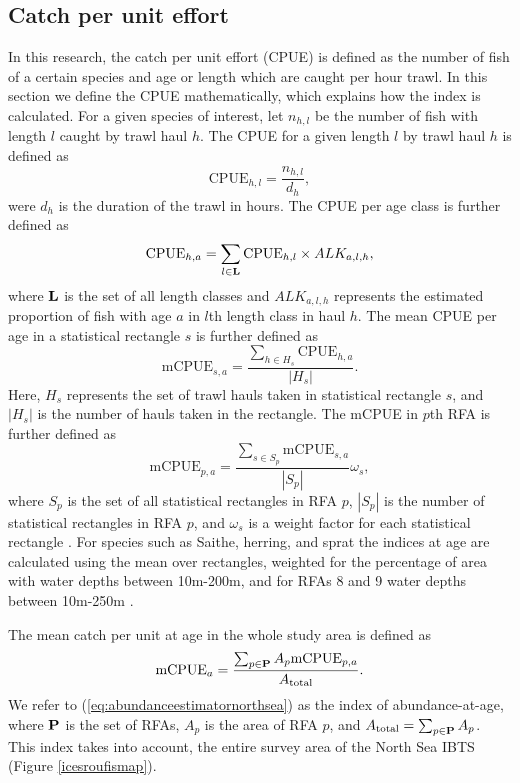 \documentclass[a4paper 12pt]{article}
\numberwithin{equation}{section}
\begin{document}
\subsection{Catch per unit effort}
\label{sec:cpueestimators}
In this research, the catch per unit effort (CPUE) is defined as the number of fish of a certain species and age or length which are caught per hour trawl. In this section we define the CPUE mathematically, which explains how the index is calculated. For a given species of interest, let $n_{h,l}$ be the number of fish with length $l$ caught by trawl haul $h$. The CPUE for a given length $l$ by trawl haul $h$ is defined as 
\begin{equation}\label{eq:cpueHaul}
\mathrm{CPUE}_{h,l} =\frac{n_{h,l}}{d_h},
\end{equation}
were $d_h$ is the duration of the trawl in hours. The CPUE per age class is further defined as
\begin{equation}\label{eq:cpueALK}
\mathrm{CPUE}_{h,a} =\sum_{l \in {\bf L}}\mathrm{CPUE}_{h, l} \times ALK_{a,l,h},
\end{equation}
where ${\bf L}$ is the set of all length classes and $ALK_{a,l,h}$ represents the estimated proportion of fish with age $a$ in $l$th length class in haul $h$. The mean CPUE per age in a statistical rectangle $s$ is further defined as
\begin{equation}\label{eq:cpueRec}
\mathrm{mCPUE}_{s,a} =\frac{\sum_{h \in H_{s}} \mathrm{CPUE}_{h,a}}{|H_{s}|}.
\end{equation}
Here, $H_{s}$ represents the set of trawl hauls taken in statistical rectangle $s$, and $|H_{s}|$ is the number of hauls taken in the rectangle. The mCPUE in $p$th RFA is further defined as
\begin{equation}\label{eq:cpueRFA}
\mathrm{mCPUE}_{p,a} = \frac{ \sum_{s \in S_{p}} \mathrm{mCPUE}_{s,a}}{|S_{p}|} \omega_s,
\end{equation}
where $S_{p}$ is the set of all statistical rectangles in RFA $p$, $|S_{p}|$ is the number of statistical rectangles in RFA $p$, and $\omega_s$ is a weight factor for each statistical rectangle \citep{ICES2013}. For species such as Saithe, herring, and sprat the indices at age are calculated using the mean over rectangles, weighted for the percentage of area with water depths between 10m-200m, and for RFAs 8 and 9 water depths between 10m-250m \citep{ICES2013}.

 The mean catch per unit at age in the whole study area is defined as
\begin{equation}
\text{mCPUE}_a= \frac{\sum_{p\in {\bf P}} A_{p}  \mathrm{mCPUE}_{p,a}}{A_{\text{total}}}.
\label{eq:abundanceestimatornorthsea}
\end{equation}
We refer to (\ref{eq:abundanceestimatornorthsea}) as the index of abundance-at-age, where ${\bf P}$ is the set of RFAs, $A_p$ is the area of RFA $p$, and $A_{\text{total}} = \sum_{p\in {\bf P}} A_{p}$. This index takes into account, the entire survey area of the North Sea IBTS (Figure \ref{icesroufismap}). 
\end{document}
